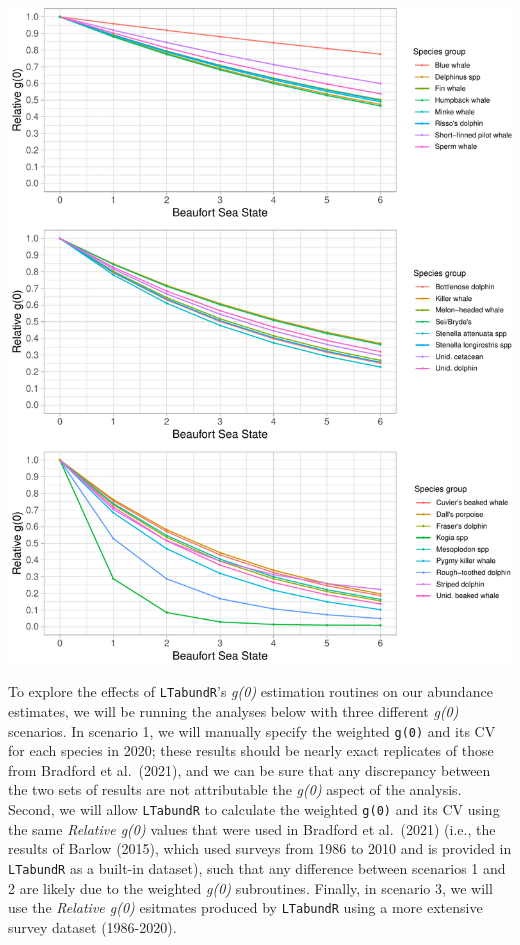 \documentclass[
]{book}
\begin{document}
\includegraphics{figures/unnamed-chunk-338-1.pdf}

To explore the effects of \texttt{LTabundR}'s \emph{g(0)} estimation routines on our abundance estimates, we will be running the analyses below with three different \emph{g(0)} scenarios. In scenario 1, we will manually specify the weighted \texttt{g(0)} and its CV for each species in 2020; these results should be nearly exact replicates of those from Bradford et al.~(2021), and we can be sure that any discrepancy between the two sets of results are not attributable the \emph{g(0)} aspect of the analysis. Second, we will allow \texttt{LTabundR} to calculate the weighted \texttt{g(0)} and its CV using the same \emph{Relative g(0)} values that were used in Bradford et al.~(2021) (i.e., the results of Barlow (2015), which used surveys from 1986 to 2010 and is provided in \texttt{LTabundR} as a built-in dataset), such that any difference between scenarios 1 and 2 are likely due to the weighted \emph{g(0)} subroutines. Finally, in scenario 3, we will use the \emph{Relative g(0)} esitmates produced by \texttt{LTabundR} using a more extensive survey dataset (1986-2020).
\end{document}
